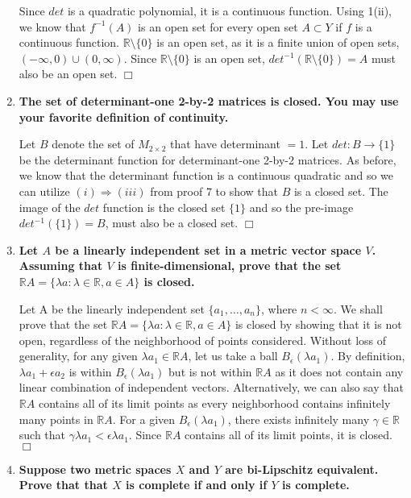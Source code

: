 \documentclass[5pt,letterpaper,reqno]{amsart}
\newcommand{\R}{\mathbb R}
\begin{document}
\begin{enumerate}[1.]
\begin{flushleft}
\[    \]
    Since $det$ is a quadratic polynomial, it is a continuous function. Using 1(ii), we know that $f^{-1}(A)$ is an open set for every open set $A\subset Y$ if $f$ is a continuous function. $\R\setminus\{0\}$ is an open set, as it is a finite union of open sets, $(-\infty, 0) \cup (0, \infty)$. Since $\R\setminus\{0\}$ is an open set, $det^{-1}(\R\setminus\{0\}) = A$ must also be an open set. $\Box$
    \end{flushleft}
\item \textbf{The set of determinant-one 2-by-2 matrices is closed. You may use your favorite definition of continuity.}
\begin{flushleft}
    Let $B$ denote the set of $M_{2\times2}$ that have determinant $= 1$.
    Let $det: B \rightarrow \{1\}$ be the determinant function for determinant-one 2-by-2 matrices. As before, we know that the determinant function is a continuous quadratic and so we can utilize $(i) \Rightarrow (iii)$ from proof 7 to show that $B$ is a closed set. The image of the $det$ function is the closed set $\{1\}$ and so the pre-image $det^{-1}(\{1\}) = B$, must also be a closed set. $\Box$
    \end{flushleft}
\newpage
\item \textbf{Let $A$ be a linearly independent set in a metric vector space $V$. Assuming that $V$ is finite-dimensional, prove that the set $\R A=\{\lambda a : \lambda \in \R, a\in A\}$ is closed.}
\begin{flushleft}
    Let A be the linearly independent set $\{a_1, \ldots, a_n \}$, where $n < \infty$. We shall prove that the set $\R A=\{\lambda a : \lambda \in \R, a\in A\}$ is closed by showing that it is not open, regardless of the neighborhood of points considered. Without loss of generality, for any given $\lambda a_1 \in \R A$, let us take a ball $B_\epsilon(\lambda a_1)$. By definition, $\lambda a_1 + \epsilon a_2$ is within $B_\epsilon(\lambda a_1)$ but is not within $\R A$ as it does not contain any linear combination of independent vectors. Alternatively, we can also say that $\R A$ contains all of its limit points as every neighborhood contains infinitely many points in $\R A$. For a given $B_\epsilon(\lambda a_1)$, there exists infinitely many $\gamma \in \R$ such that $\gamma \lambda a_1 < \epsilon \lambda a_1$. Since $\R A$ contains all of its limit points, it is closed. $\Box$
    \end{flushleft}
\item \textbf{Suppose two metric spaces $X$ and $Y$ are bi-Lipschitz equivalent. Prove that that $X$ is complete if and only if $Y$ is complete.}

\end{enumerate}
\end{document}
